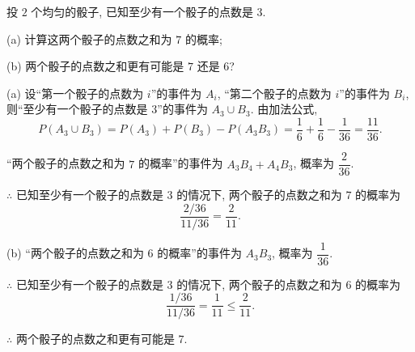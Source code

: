 \documentclass[color=black,device=normal,lang=cn]{elegantnote}
\numberwithin{equation}{section}
\theoremstyle{plain}
\numberwithin{exercise}{exsection}
\begin{document}
\begin{exercise}%
    投 $2$ 个均匀的骰子, 已知至少有一个骰子的点数是 $3$.

    (a) 计算这两个骰子的点数之和为 $7$ 的概率;
    
    (b) 两个骰子的点数之和更有可能是 $7$ 还是 $6$?
\end{exercise}
\begin{solution}
    (a) 设``第一个骰子的点数为 $i$''的事件为 $A_i$, ``第二个骰子的点数为 $i$''的事件为 $B_i$, 则``至少有一个骰子的点数是 $3$''的事件为 $A_3\cup B_3$. 由加法公式,
    \[P(A_3\cup B_3)=P(A_3)+P(B_3)-P(A_3B_3)=\dfrac{1}{6}+\dfrac{1}{6}-\dfrac{1}{36}=\dfrac{11}{36}.\]

    ``两个骰子的点数之和为 $7$ 的概率''的事件为 $A_3B_4+A_4B_3$, 概率为 $\dfrac{2}{36}$.

    $\therefore$ 已知至少有一个骰子的点数是 $3$ 的情况下, 两个骰子的点数之和为 $7$ 的概率为
    \[\dfrac{2/36}{11/36}=\dfrac{2}{11}.\]

    (b) ``两个骰子的点数之和为 $6$ 的概率''的事件为 $A_3B_3$, 概率为 $\dfrac{1}{36}$.

    $\therefore$ 已知至少有一个骰子的点数是 $3$ 的情况下, 两个骰子的点数之和为 $6$ 的概率为
    \[\dfrac{1/36}{11/36}=\dfrac{1}{11}\leq\dfrac{2}{11}.\]
    
    $\therefore$ 两个骰子的点数之和更有可能是 $7$.
\end{solution}
\end{document}
